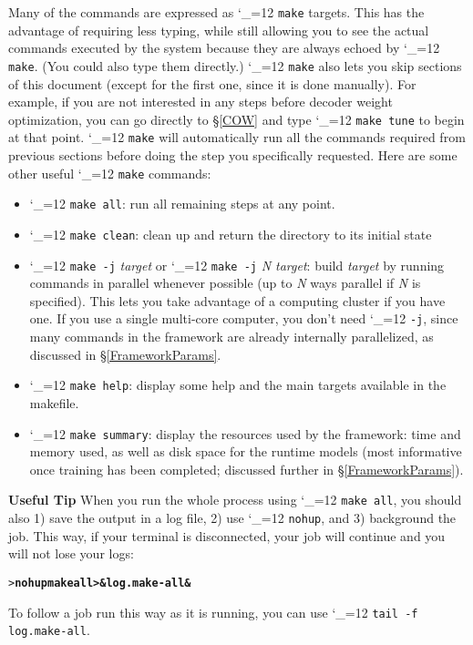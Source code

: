 \documentclass[11pt,letterpaper]{article}
\def\code{\begingroup\catcode`\_=12 \codex}
\newcommand{\codex}[1]{\texttt{#1}\endgroup}
\newcommand{\tip}{\textbf{Useful Tip \large{\ding{43}} }}
\newcommand{\margintip}{\marginpar[{\textbf{Tip \large{\ding{43}}}}]{\textbf{\reflectbox{\large{\ding{43}}} Tip}}}
\newcommand{\tipend}{\textbf{ \reflectbox{\large{\ding{43}}}}}
\begin{document}
Many of the commands are expressed as \code{make} targets. This has the
advantage of requiring less typing, while still allowing you to see the actual
commands executed by the system because they are always echoed by \code{make}.
(You could also type them directly.) \code{make} also lets you skip
sections of this document (except for the first one, since it is done
manually). For example, if you are not interested in any steps before decoder
weight optimization, you can go directly to \S\ref{COW} and type
\code{make tune} to begin at that point. \code{make} will automatically run all
the commands required from previous sections before doing the step you
specifically requested. Here are some other useful \code{make} commands:
\begin{itemize}
\item \code{make all}: run all remaining steps at any point.
\item \code{make clean}: clean up and return the directory to its initial state
\item \code{make -j} \emph{target} or \code{make -j} \emph{N target}: build
      \emph{target} by running commands in parallel whenever possible (up to
      \emph{N} ways parallel if \emph{N} is specified). This lets you take
      advantage of a computing cluster if you have one. If you use a single
      multi-core computer, you don't need \code{-j}, since many commands in the
      framework are already internally parallelized, as discussed in
      \S\ref{FrameworkParams}.
\item \code{make help}: display some help and the main targets available in
      the makefile.
\item \code{make summary}: display the resources used by the framework: time
      and memory used, as well as disk space for the runtime models (most
      informative once training has been completed; discussed further in
      \S\ref{FrameworkParams}).
\end{itemize}

\tip\margintip When you run the whole process using \code{make all}, you should
also 1) save the output in a log file, 2) use \code{nohup}, and 3) background
the job. This way, if your terminal is disconnected, your job will continue and
you will not lose your logs:
\begin{small}
\begin{alltt}
   > \textbf{nohup make all >& log.make-all &}
\end{alltt}
\end{small}
To follow a job run this way as it is running, you can use \code{tail -f
log.make-all}.\tipend
\end{document}
